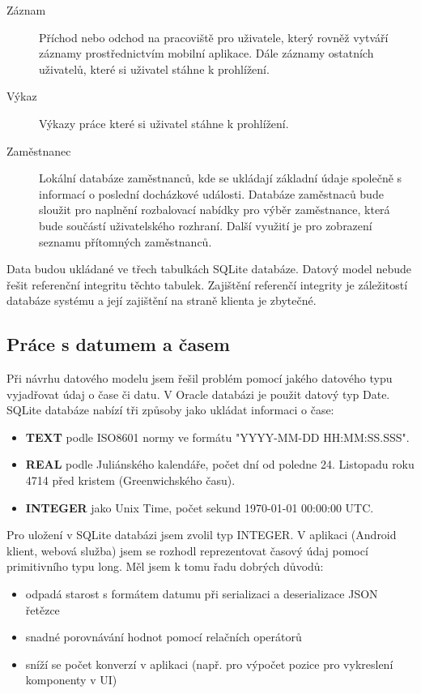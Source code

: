\documentclass{diplomka}
\begin{document}
\begin{description}
\item [Záznam]
Příchod nebo odchod na pracoviště pro uživatele, který rovněž vytváří záznamy prostřednictvím mobilní aplikace. Dále záznamy ostatních uživatelů, které si uživatel stáhne k prohlížení.
\item [Výkaz]
Výkazy práce které si uživatel stáhne k prohlížení.
\item [Zaměstnanec] 
Lokální databáze zaměstnanců, kde se ukládají základní údaje společně s informací o poslední docházkové události. Databáze zaměstnaců bude sloužit pro naplnění rozbalovací nabídky pro výběr zaměstnance, která bude součástí uživatelského rozhraní.
Další využití je pro zobrazení seznamu přítomných zaměstnanců.
\end{description}

Data budou ukládané ve třech tabulkách SQLite databáze. Datový model nebude řešit referenční integritu těchto tabulek. Zajištění referenčí integrity je záležitostí databáze systému a její zajištění na straně klienta je zbytečné.

\newpage
\subsection{Práce s datumem a časem}
Při návrhu datového modelu jsem řešil problém pomocí jakého datového typu vyjadřovat údaj o čase či datu. V Oracle databázi je použit datový typ Date. SQLite databáze nabízí tři způsoby jako ukládat informaci o čase:
\begin{itemize}
\item \textbf{TEXT} podle ISO8601 normy ve formátu "YYYY-MM-DD HH:MM:SS.SSS".
\item \textbf{REAL} podle Juliánského kalendáře, počet dní od poledne 24. Listopadu roku 4714 před kristem (Greenwichského času).
\item \textbf{INTEGER} jako Unix Time, počet sekund 1970-01-01 00:00:00 UTC.
\end{itemize}

\noindent
Pro uložení v SQLite databázi jsem zvolil typ INTEGER. V aplikaci (Android klient, webová služba) jsem se rozhodl reprezentovat časový údaj pomocí primitivního typu long. Měl jsem k tomu řadu dobrých důvodů:
\begin{itemize}
\item odpadá starost s formátem datumu při serializaci a deserializace JSON řetězce
\item snadné porovnávání hodnot pomocí relačních operátorů
\item sníží se počet konverzí v aplikaci (např. pro výpočet pozice pro vykreslení komponenty v UI)
\end{itemize}
\end{document}
